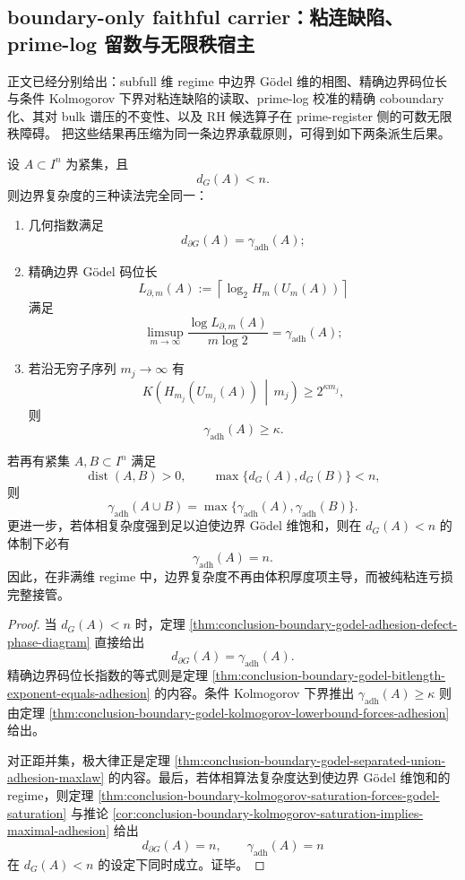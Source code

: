 \subsection{boundary-only faithful carrier：粘连缺陷、prime-log 留数与无限秩宿主}

正文已经分别给出：subfull 维 regime 中边界 Gödel 维的相图、精确边界码位长与条件 Kolmogorov 下界对粘连缺陷的读取、prime-log 校准的精确 coboundary 化、其对 bulk 谱压的不变性、以及 RH 候选算子在 prime-register 侧的可数无限秩障碍。
把这些结果再压缩为同一条边界承载原则，可得到如下两条派生后果。

\begin{theorem}\label{thm:derived-subfull-boundary-complexity-equals-adhesion}
设 \(A\subset I^n\) 为紧集，且
\[
d_G(A)<n.
\]
则边界复杂度的三种读法完全同一：
\begin{enumerate}
\normalfont
  \item 几何指数满足
  \[
  d_{\partial G}(A)=\gamma_{\mathrm{adh}}(A);
  \]
  \item 精确边界 Gödel 码位长
  \[
  L_{\partial,m}(A):=\left\lceil\log_2 H_m(U_m(A))\right\rceil
  \]
  满足
  \[
  \limsup_{m\to\infty}\frac{\log L_{\partial,m}(A)}{m\log 2}
  =
  \gamma_{\mathrm{adh}}(A);
  \]
  \item 若沿无穷子序列 \(m_j\to\infty\) 有
  \[
  K\!\left(H_{m_j}(U_{m_j}(A))\,\middle|\,m_j\right)\ge 2^{\kappa m_j},
  \]
  则
  \[
  \gamma_{\mathrm{adh}}(A)\ge \kappa.
  \]
\end{enumerate}
若再有紧集 \(A,B\subset I^n\) 满足
\[
\operatorname{dist}(A,B)>0,
\qquad
\max\{d_G(A),d_G(B)\}<n,
\]
则
\[
\gamma_{\mathrm{adh}}(A\cup B)
=
\max\{\gamma_{\mathrm{adh}}(A),\gamma_{\mathrm{adh}}(B)\}.
\]
更进一步，若体相复杂度强到足以迫使边界 Gödel 维饱和，则在 \(d_G(A)<n\) 的体制下必有
\[
\gamma_{\mathrm{adh}}(A)=n.
\]
因此，在非满维 regime 中，边界复杂度不再由体积厚度项主导，而被纯粘连亏损完整接管。
\end{theorem}

\begin{proof}
当 \(d_G(A)<n\) 时，定理
\ref{thm:conclusion-boundary-godel-adhesion-defect-phase-diagram}
直接给出
\[
d_{\partial G}(A)=\gamma_{\mathrm{adh}}(A).
\]
精确边界码位长指数的等式则是定理
\ref{thm:conclusion-boundary-godel-bitlength-exponent-equals-adhesion}
的内容。条件 Kolmogorov 下界推出 \(\gamma_{\mathrm{adh}}(A)\ge \kappa\) 则由定理
\ref{thm:conclusion-boundary-godel-kolmogorov-lowerbound-forces-adhesion}
给出。

对正距并集，极大律正是定理
\ref{thm:conclusion-boundary-godel-separated-union-adhesion-maxlaw}
的内容。最后，若体相算法复杂度达到使边界 Gödel 维饱和的 regime，则定理
\ref{thm:conclusion-boundary-kolmogorov-saturation-forces-godel-saturation}
与推论
\ref{cor:conclusion-boundary-kolmogorov-saturation-implies-maximal-adhesion}
给出
\[
d_{\partial G}(A)=n,
\qquad
\gamma_{\mathrm{adh}}(A)=n
\]
在 \(d_G(A)<n\) 的设定下同时成立。证毕。
\end{proof}

